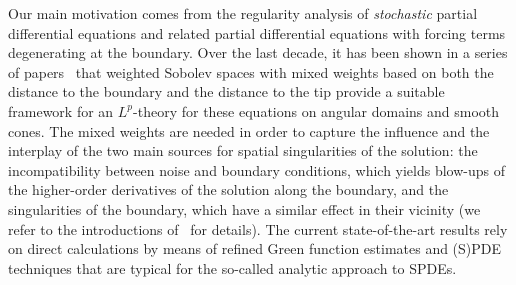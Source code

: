 \documentclass[12pt,a4paper, reqno]{amsart}
\theoremstyle{plain}
\theoremstyle{definition}
\theoremstyle{remark}
\numberwithin{equation}{section}
\newcommand{\1}{\mathbbm{1}}
\begin{document}
Our main motivation comes from the regularity analysis of \emph{stochastic} partial differential equations and related partial differential equations with forcing terms degenerating at the boundary. 
Over the last decade, it has been shown in a series of papers~\cite{Cio20,CioKimLee2019, KimLeeSeo2021,KimLeeSeo2022b} that weighted Sobolev spaces with mixed weights based on both the distance to the boundary and the distance to the tip provide a suitable framework for an $L^p$-theory for these equations on angular domains and smooth cones. 
The mixed weights are needed in order to capture the influence and the interplay of the two main sources for spatial singularities of the solution: 
the incompatibility between noise and boundary conditions, which yields  blow-ups of the higher-order derivatives of the solution along the boundary, and the singularities of the boundary, which have a similar effect in their vicinity (we refer to the introductions of~\cite{CioKimKyeLeeLin2018,cioicalicht2024sobolevspacesmixedweights} for details).
The current state-of-the-art results rely on direct calculations by means of refined Green function estimates and  (S)PDE techniques that are typical for the so-called analytic approach to SPDEs. 
\end{document}
